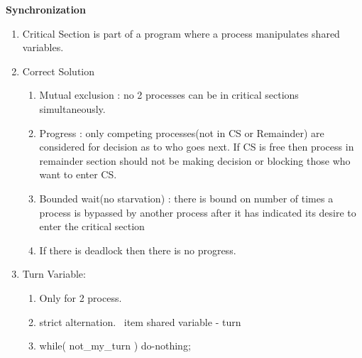 
\centerline{\textbf{ \LARGE Synchronization}}




\begin{enumerate}

  \item Critical Section is part of a program where a process manipulates shared variables.
  \item Correct Solution
  \begin{enumerate}
    \item Mutual exclusion : no 2 processes can be in critical sections simultaneously.
    \item Progress : only competing processes(not in CS or Remainder) are considered for decision as to who goes next.
          If CS is free then process in remainder section should not be making decision or blocking those who want to enter CS.
    \item Bounded wait(no starvation) : there is bound on number of times a process is bypassed by another process after
          it has indicated its desire to enter the critical section
    \item If there is deadlock then there is no progress.
  \end{enumerate}

  \item Turn Variable:
  \begin{enumerate}
    \item Only for 2 process.
    \item strict alternation.
    \ item shared variable - turn
    \item while( not\_my\_turn ) do-nothing;
  \end{enumerate}
      \begin{myTableStyle}
        \begin{tabular}{ |m{5cm}|m{5cm}| } \hline
               &        \\ \hline
        \end{tabular}
      \end{myTableStyle}
      \vspace{0.08in}


\end{enumerate}
